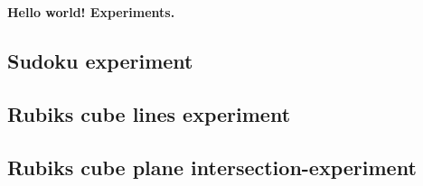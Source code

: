 \documentclass[../../main]{subfiles}
\begin{document}
\textbf{Hello world! Experiments.}

\subsection{Sudoku experiment}

\newpage

\subsection{Rubiks cube lines experiment}

\newpage

\subsection{Rubiks cube plane intersection-experiment}

\newpage
\end{document}
